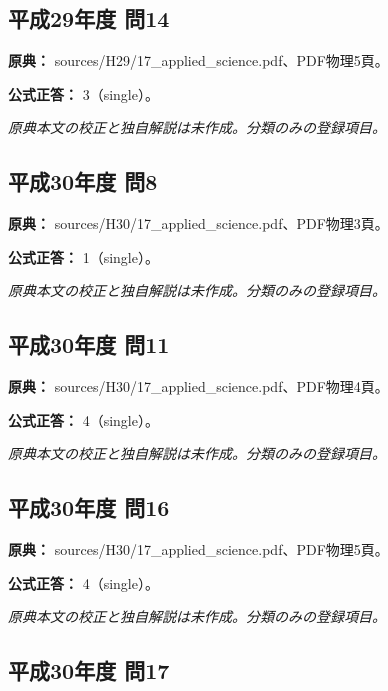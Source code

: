 \subsection{平成29年度 問14}
\label{q:h29-reg-applied-14}

\noindent\textbf{原典：} sources/H29/17\_applied\_science.pdf、PDF物理5頁。

\textbf{公式正答：} 3（single）。

\par\textit{原典本文の校正と独自解説は未作成。分類のみの登録項目。}

\subsection{平成30年度 問8}
\label{q:h30-reg-applied-08}

\noindent\textbf{原典：} sources/H30/17\_applied\_science.pdf、PDF物理3頁。

\textbf{公式正答：} 1（single）。

\par\textit{原典本文の校正と独自解説は未作成。分類のみの登録項目。}

\subsection{平成30年度 問11}
\label{q:h30-reg-applied-11}

\noindent\textbf{原典：} sources/H30/17\_applied\_science.pdf、PDF物理4頁。

\textbf{公式正答：} 4（single）。

\par\textit{原典本文の校正と独自解説は未作成。分類のみの登録項目。}

\subsection{平成30年度 問16}
\label{q:h30-reg-applied-16}

\noindent\textbf{原典：} sources/H30/17\_applied\_science.pdf、PDF物理5頁。

\textbf{公式正答：} 4（single）。

\par\textit{原典本文の校正と独自解説は未作成。分類のみの登録項目。}

\subsection{平成30年度 問17}
\label{q:h30-reg-applied-17}

